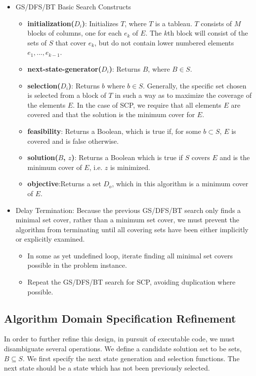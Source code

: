 \documentclass[12pt]{article}
\begin{document}
\begin{itemize}
	\item GS/DFS/BT Basic Search Constructs
	\begin{itemize}
		\item \textbf{initialization($D_i$)}: Initializes $T$, where $T$ is a tableau. $T$ consists of $M$ blocks of columns, one for each $e_k$ of $E$. The $k$th block will consist of the sets of $S$ that cover $e_k$, but do not contain lower numbered elements $e_1,...,e_{k-1}$.	
		\item \textbf{next-state-generator($D_i$)}: Returns $B$, where $B \in S$.
		\item \textbf{selection($D_i$)}: Returns $b$ where $b \in S$. Generally, the specific set chosen is selected from a block of $T$ in such a way as to maximize the coverage of the elements $E$. In the case of SCP, we require that all elements $E$ are covered and that the solution is the minimum cover for $E$.
		\item \textbf{feasibility}: Returns a Boolean, which is true if, for some $b \subset S$, $E$ is covered and is false otherwise.
		\item \textbf{solution($B$, $z$)}: Returns a Boolean which is true if $S$ covers $E$ and is the minimum cover of $E$, i.e. $z$ is minimized.
		\item \textbf{objective}:Returns a set $D_o$, which in this algorithm is a minimum cover of $E$.
	\end{itemize}
	\item Delay Termination: Because the previous GS/DFS/BT search only finds a minimal set cover, rather than a minimum set cover, we must prevent the algorithm from terminating until all covering sets have been either implicitly or explicitly examined.
	\begin{itemize}
		\item In some as yet undefined loop, iterate finding all minimal set covers possible in the problem instance.
		\item Repeat the GS/DFS/BT search for SCP, avoiding duplication where possible.
	\end{itemize}
\end{itemize}

\subsection{Algorithm Domain Specification Refinement}


In order to further refine this design, in pursuit of executable code, we must disambiguate several operations. We define a candidate solution set to be sets, $B \subseteq S$. We first specify the next state generation and selection functions. The next state should be a state which has not been previously selected.
\end{document}

